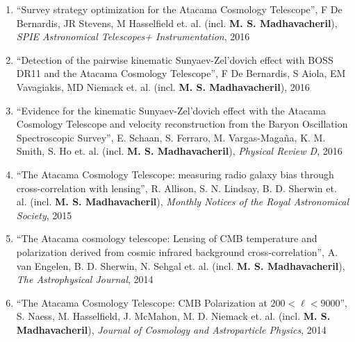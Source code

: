 \documentclass[10pt,margin]{res}
\begin{document}
\begin{resume}
\begin{enumerate}
\item ``Survey strategy optimization for the Atacama Cosmology Telescope'', F De Bernardis, JR Stevens, M Hasselfield et. al. (incl. {\bf M. S. Madhavacheril}), {\sl SPIE Astronomical Telescopes+ Instrumentation}, 2016
\item ``Detection of the pairwise kinematic Sunyaev-Zel'dovich effect with BOSS DR11 and the Atacama Cosmology Telescope'', F De Bernardis, S Aiola, EM Vavagiakis, MD Niemack et. al. (incl. {\bf M. S. Madhavacheril}), 2016
\item ``Evidence for the kinematic Sunyaev-Zel’dovich effect with the Atacama Cosmology Telescope and velocity reconstruction from the Baryon Oscillation Spectroscopic Survey'', E. Schaan, S. Ferraro, M. Vargas-Magaña, K. M. Smith, S. Ho et. al. (incl. {\bf M. S. Madhavacheril}), {\sl Physical Review D}, 2016
\item ``The Atacama Cosmology Telescope: measuring radio galaxy bias through cross-correlation with lensing'', R. Allison, S. N. Lindsay, B. D. Sherwin et. al. (incl. {\bf M. S. Madhavacheril}), {\sl Monthly Notices of the Royal Astronomical Society}, 2015
\item ``The Atacama cosmology telescope: Lensing of CMB temperature and polarization derived from cosmic infrared background cross-correlation'', A. van Engelen, B. D. Sherwin, N. Sehgal et. al. (incl. {\bf M. S. Madhavacheril}), {\sl The Astrophysical Journal}, 2014
\item ``The Atacama Cosmology Telescope: CMB Polarization at $200< \ell< 9000$'', S. Naess, M. Hasselfield, J. McMahon, M. D. Niemack et. al. (incl. {\bf M. S. Madhavacheril}), {\sl Journal of Cosmology and Astroparticle Physics}, 2014
\end{enumerate}

\end{resume}
\end{document}
